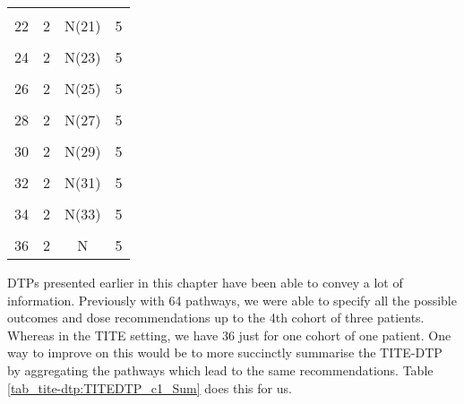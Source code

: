 \begin{table}[H]
{\begin{tabular}[t]{cccc}
			\cellcolor{gray!6}{21} & \cellcolor{gray!6}{2} & \cellcolor{gray!6}{N(20)} & \cellcolor{gray!6}{5}\\
			22 & 2 & N(21) & 5\\
			\cellcolor{gray!6}{23} & \cellcolor{gray!6}{2} & \cellcolor{gray!6}{N(22)} & \cellcolor{gray!6}{5}\\
			24 & 2 & N(23) & 5\\
			\cellcolor{gray!6}{25} & \cellcolor{gray!6}{2} & \cellcolor{gray!6}{N(24)} & \cellcolor{gray!6}{5}\\
			26 & 2 & N(25) & 5\\
			\cellcolor{gray!6}{27} & \cellcolor{gray!6}{2} & \cellcolor{gray!6}{N(26)} & \cellcolor{gray!6}{5}\\
			28 & 2 & N(27) & 5\\
			\cellcolor{gray!6}{29} & \cellcolor{gray!6}{2} & \cellcolor{gray!6}{N(28)} & \cellcolor{gray!6}{5}\\
			30 & 2 & N(29) & 5\\
			\cellcolor{gray!6}{31} & \cellcolor{gray!6}{2} & \cellcolor{gray!6}{N(30)} & \cellcolor{gray!6}{5}\\
			32 & 2 & N(31) & 5\\
			\cellcolor{gray!6}{33} & \cellcolor{gray!6}{2} & \cellcolor{gray!6}{N(32)} & \cellcolor{gray!6}{5}\\
			34 & 2 & N(33) & 5\\
			\cellcolor{gray!6}{35} & \cellcolor{gray!6}{2} & \cellcolor{gray!6}{N(34)} & \cellcolor{gray!6}{5}\\
			36 & 2 & N & 5\\
			\bottomrule
	\end{tabular}}
\end{table}

DTPs presented earlier in this chapter have been able to convey a lot of information. Previously with 64 pathways, we were able to specify all the possible outcomes and dose recommendations up to the 4th cohort of three patients. Whereas in the TITE setting, we have 36 just for one cohort of one patient. One way to improve on this would be to more succinctly summarise the TITE-DTP by aggregating the pathways which lead to the same recommendations. Table \ref{tab_tite-dtp:TITEDTP_c1_Sum} does this for us. 

